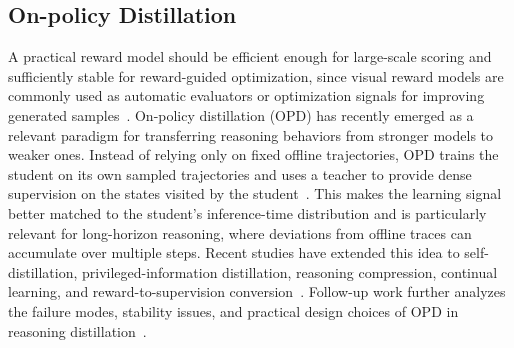 \documentclass{llmxive}
\providecommand{\mname}{\twemoji[width=0.75em]{zap}-Reward\xspace}
\begin{document}
\subsection{On-policy Distillation}
A practical reward model should be efficient enough for large-scale scoring and sufficiently stable for reward-guided optimization, since visual reward models are commonly used as automatic evaluators or optimization signals for improving generated samples~\cite{xu2023imagereward,wu2025rewarddancerewardscalingvisual,yang2026joint}.
On-policy distillation (OPD) has recently emerged as a relevant paradigm for transferring reasoning behaviors from stronger models to weaker ones. Instead of relying only on fixed offline trajectories, OPD trains the student on its own sampled trajectories and uses a teacher to provide dense supervision on the states visited by the student~\cite{Agarwal2023OnPolicyDO,lu2025onpolicy}. This makes the learning signal better matched to the student's inference-time distribution and is particularly relevant for long-horizon reasoning, where deviations from offline traces can accumulate over multiple steps. Recent studies have extended this idea to self-distillation, privileged-information distillation, reasoning compression, continual learning, and reward-to-supervision conversion~\cite{zhao2026selfdistilledreasoneronpolicyselfdistillation,penaloza2026privileged,shenfeld2026selfdistillationenablescontinuallearning,Sang2026CRISPCR,he2026selfdistillationzeroselfrevisionturns}. Follow-up work further analyzes the failure modes, stability issues, and practical design choices of OPD in reasoning distillation~\cite{song2026surveyonpolicydistillationlarge,fu2026revisitingonpolicydistillationempirical,li2026rethinkingonpolicydistillationlarge,jang2026stableonpolicydistillationadaptive,zhu2026facesonpolicydistillationpitfalls}.

\end{document}

